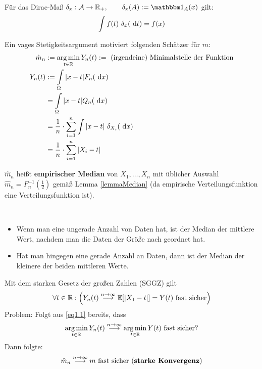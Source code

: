 \begin{erinnerung}
	Für das Dirac-Maß $\delta_x:\A\to\R_+,\qquad\delta_x(A):=\indi_A(x)$ gilt:
	\begin{align*}
		\int\limits f(t)~\delta_x(\text{ d} t)=f(x)
	\end{align*}
\end{erinnerung}

Ein vages Stetigkeitsargument motiviert folgenden Schätzer für $m$:
\begin{align*}
	\hat{m}_n&:=\operatorname*{arg\,min}\limits_{t\in\mathbb{R}}Y_n(t):=\text{ (irgendeine) Minimalstelle der Funktion}\\
	Y_n(t)&:=\int\limits_\Omega |x-t|F_n(\text{ d} x)\\ 
	&=\int\limits_\Omega |x-t|Q_n(\text{ d} x)\\ 
	&=\frac{1}{n}\cdot\sum\limits_{i=1}^n\int\limits|x-t|~\delta_{X_i}(\text{ d} x)\\
	&=\frac{1}{n}\cdot\sum\limits_{i=1}^n|X_i-t|
\end{align*} 

$\hat{m}_n$ heißt \textbf{empirischer Median} von $X_1,\ldots,X_n$ mit üblicher Auswahl $\hat{m}_n=F_n^{-1}\left(\frac{1}{2}\right)$ gemäß Lemma \ref{lemmaMedian} (da empirische Verteilungsfunktion eine Verteilungsfunktion ist).


\begin{bemerkung}\
	\begin{itemize}
		\item Wenn man eine ungerade Anzahl von Daten hat, ist der Median der mittlere Wert, nachdem man die Daten der Größe nach geordnet hat.
		\item Hat man hingegen eine gerade Anzahl an Daten, dann ist der Median der kleinere der beiden mittleren Werte.
	\end{itemize}
\end{bemerkung}

Mit dem starken Gesetz der großen Zahlen (SGGZ) gilt
\begin{align}\label{eq1.1}
	\forall t\in\mathbb{R}: \Big(Y_n(t)\stackrel{n\to\infty}{\longrightarrow}
	\mathbb{E}[|X_1-t|]=Y(t)\text{ fast sicher}\Big)
\end{align}
Problem: Folgt aus \eqref{eq1.1} bereits, dass
\begin{align*}
	\operatorname*{arg\,min}\limits_{t\in\mathbb{R}} Y_n(t)
	\stackrel{n\to\infty}{\longrightarrow}
	\operatorname*{arg\,min}\limits_{t\in\mathbb{R}}
	Y(t)\text{ fast sicher?}
\end{align*}
Dann folgte:
\begin{align*}
	\hat{m}_n
	\stackrel{n\to\infty}{\longrightarrow}
	m\text{ fast sicher (\textbf{starke Konvergenz})}
\end{align*}

